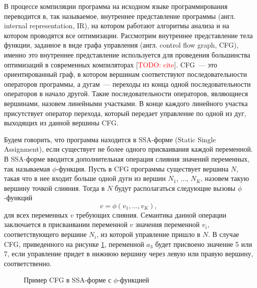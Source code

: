 \documentclass[14pt,titlepage]{extarticle}
\newcommand{\todo}[1]{\textcolor{red}{TODO: #1}}
\newcommand{\todocite}{[\todo{cite}]}
\newcommand{\eng}[1]{{\English#1}}
\begin{document}
      В процессе компиляции программа на исходном языке программирования
      переводится в, так называемое, внутреннее представление программы
      (англ. \eng{internal representation, IR}), на котором работают
      алгоритмы анализа и на котором проводятся все оптимизации.
      Рассмотрим внутреннее представление тела функции, заданное в виде
      графа управления (англ. \eng{control flow graph, CFG}), именно это
      внутреннее представление используется для проведения большинства
      оптимизаций в современных компиляторах \todocite.
      CFG~--- это ориентированный граф, в котором вершинам соответствуют
      последовательности операторов программы, а дугам~--- переходы из конца
      одной последовательности операторов в начало другой. Такие
      последовательности операторов, являющиеся вершинами, назовем линейными
      участками. В конце каждого линейного участка присутствует оператор
      перехода, который передает управление по одной из дуг, выходящих из
      данной вершины CFG.

      Будем говорить, что программа находится в SSA-форме (\eng{Static Single
      Assignment}), если существует не более одного присваивания каждой
      переменной. В SSA-форме вводится дополнительная операция слияния значений
      переменных, так называемая $\phi$-функция. Пусть в CFG программы
      существует вершина $N$, такая что в нее входит больше одной дуги из
      вершин $N_1$, ..., $N_K$, назовем такую вершину точкой слияния. Тогда в
      $N$ будут располагаться следующие вызовы $\phi$-функций
      \[ v = \phi(v_1, ..., v_K), \]
      для всех переменных $v$ требующих слияния.
      Семантика данной операции заключается в присваивании переменной $v$
      значения переменной $v_i$, соответствующего вершине $N_i$, из которой
      управление пришло в $N$. В случае CFG, приведенного на рисунке
      \ref{fig:cfg_with_phi}, переменной $a_3$ будет присвоено значение 5 или
      7, если управление придет в нижнюю вершину через левую или правую
      вершину, соответственно.

      \begin{figure}[!htb]
        \caption{Пример CFG в SSA-форме с $\phi$-функцией}
        \label{fig:cfg_with_phi}
      \end{figure}
\end{document}

